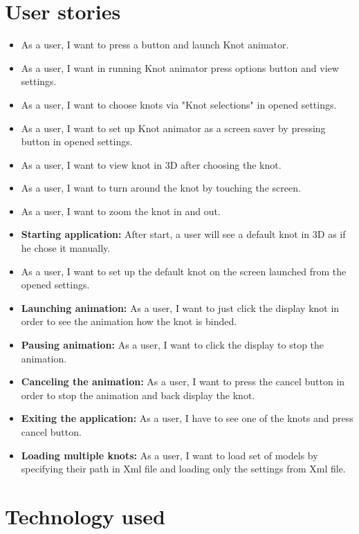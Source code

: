 \section*{User stories} %
\label{sec:User stories}
\begin{itemize}
  \item As a user, I want to press a button and launch Knot animator. 
  \item As a user, I want in running Knot animator press options button and view settings.
  \item As a user, I want to choose knots via "Knot selections" in opened settings.
  \item As a user, I want to set up Knot animator as a screen saver by pressing button in opened settings.
  \item As a user, I want to view knot in 3D after choosing the knot.
  \item As a user, I want to turn around the knot by touching the screen.
  \item As a user, I want to zoom the knot in and out.
  \item {\bf Starting application:} After start, a user will see a default knot in 3D as if he chose it manually.
  \item As a user, I want to set up the default knot on the screen launched from the opened settings.
  \item {\bf Launching animation:}  As a user, I want to just click the display knot in order to see the animation how the knot is binded.
  \item {\bf Pausing animation:} As a user, I want to click the display to stop the animation.
  \item {\bf Canceling the animation:} As a user, I want to press the cancel button in order to stop the animation and back display the knot.
  \item {\bf Exiting the application:} As a user, I have to see one of the knots and press cancel button. 
  \item {\bf Loading multiple knots:} As a user, I want to load set of models by specifying their path in Xml file and loading only the settings from Xml file.
\end{itemize}


\section*{Technology used} %
\label{sec:Technology used}


